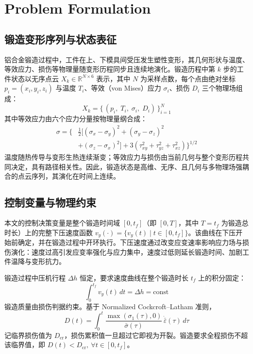 \section{Problem Formulation}

\subsection{锻造变形序列与状态表征}
铝合金锻造过程中，工件在上、下模具间受压发生塑性变形，其几何形状与温度、等效应力、损伤等物理量随变形历程同步且连续地演化。锻造历程中第 $k$ 步的工件状态以无序点云 $X_k \in \mathbb{R}^{N \times 6}$ 表示，其中 $N$ 为采样点数，每个点由绝对坐标 $p_i=(x_i,y_i,z_i)$ 与温度 $T_i$、等效（von Mises）应力 $\sigma_i$、损伤 $D_i$ 三个物理场组成：
\begin{equation}
X_k = \{\,(p_i,\; T_i,\; \sigma_i,\; D_i)\,\}_{i=1}^{N}
\label{equ:pointcloud}
\end{equation}
其中等效应力由六个应力分量按物理量纲合成：
\begin{equation}
\begin{split}
\sigma = \Big\{ &\tfrac{1}{2}\big[(\sigma_x-\sigma_y)^2+(\sigma_y-\sigma_z)^2 \\
&+(\sigma_z-\sigma_x)^2\big]+3(\tau_{xy}^2+\tau_{yz}^2+\tau_{xz}^2)\Big\}^{1/2}
\end{split}
\end{equation}
温度随热传导与变形生热连续渐变；等效应力与损伤由当前几何与整个变形历程共同决定，具有路径相关性。因此，锻造状态是高维、无序、且几何与多物理场强耦合的点云序列，其演化在时间上连续。

\subsection{控制变量与物理约束}
本文的控制决策变量是整个锻造时间域 $[0,t_f]$（即 $[0,T]$，其中 $T=t_f$ 为锻造总时长）上的完整下压速度函数 $v_y(\cdot)=\{v_y(t)\mid t\in[0,t_f]\}$。该曲线在下压开始前确定，并在锻造过程中开环执行。下压速度通过改变应变速率影响应力场与损伤演化：速度过高引发应变率强化与应力集中，速度过低则延长锻造时间、加剧工件温降与变形抗力。

锻造过程中压机行程 $\Delta h$ 恒定，要求速度曲线在整个锻造时长 $t_f$ 上的积分固定：
\begin{equation}
\int_{0}^{t_f} v_y(t)\,dt = \Delta h = \text{const}
\end{equation}
锻造质量由损伤判据约束。基于 Normalized Cockcroft--Latham 准则，
\begin{equation}
D(t) = \int_0^t \frac{\max(\sigma_1(\tau),0)}{\bar{\sigma}(\tau)}\,\dot{\bar{\varepsilon}}(\tau)\,d\tau
\end{equation}
记临界损伤值为 $D_{\text{cr}}$，损伤累积值一旦超过它即视为开裂。锻造要求全程损伤不超该临界值，即 $D(t) < D_{\text{cr}},\ \forall t\in[0,t_f]$。

